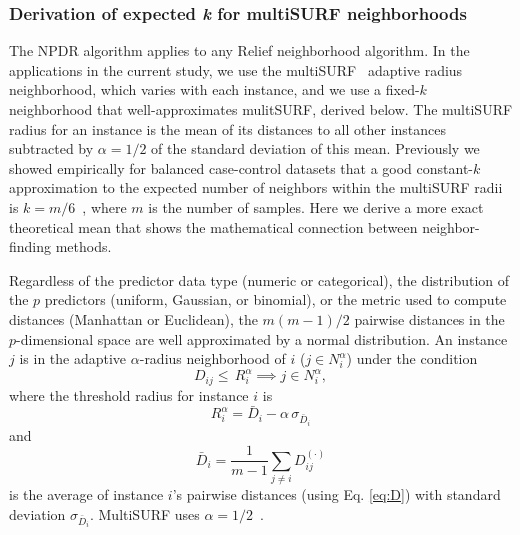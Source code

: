 \documentclass[10pt]{article}
\begin{document}

\subsubsection{Derivation of expected \textit{k} for multiSURF neighborhoods}
The NPDR algorithm applies to any Relief neighborhood algorithm. In the applications in the current study, we use the multiSURF~\cite{urbanowicz17} adaptive radius neighborhood, which varies with each instance, and we use a fixed-$k$ neighborhood that well-approximates mulitSURF, derived below. The multiSURF radius for an instance is the mean of its distances to all other instances subtracted by $\alpha=1/2$ of the standard deviation of this mean. Previously we showed empirically for balanced case-control datasets that a good constant-$k$ approximation to the expected number of neighbors within the multiSURF radii is $k=m/6$~\cite{stir}, where $m$ is the number of samples. Here we derive a more exact theoretical mean that shows the mathematical connection between neighbor-finding methods.

Regardless of the predictor data type (numeric or categorical), the distribution of the $p$ predictors (uniform, Gaussian, or binomial), or the metric used to compute distances (Manhattan or Euclidean), the $m(m-1)/2$ pairwise distances in the $p$-dimensional space are well approximated by a normal distribution. An instance $j$ is in the adaptive $\alpha$-radius neighborhood of $i$ ($j \in N^{\alpha}_{i}$) under the condition
%
%
\begin{equation}
D_{ij} \le \, R_i^{\alpha} \implies j \in N^{\alpha}_{i},
\end{equation}
where the threshold radius for instance $i$ is
\begin{equation} 
R_i^{\alpha} =  \bar{D}_i - \alpha \, \sigma_{\bar{D}_i}
\end{equation}
and 
\begin{equation}
\bar{D}_i = \frac{1}{m-1} \sum_{j \ne i} D^{(\cdot)}_{ij}
\end{equation}
is the average of instance $i$'s pairwise distances (using Eq. \ref{eq:D}) with standard deviation $\sigma_{\bar{D}_i}$. MultiSURF uses $\alpha=1/2$~\cite{msurf13}. 
 
\end{document}
